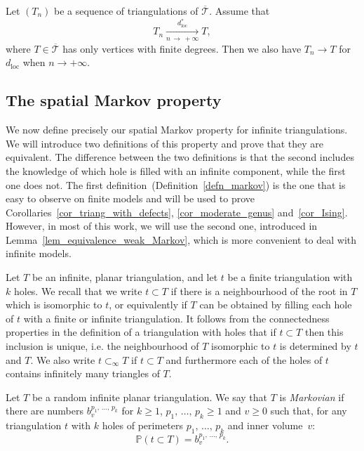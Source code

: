 \documentclass[AHL,Unicode,longabstracts,published]{cedram}
\newcommand{\loc}{\mathrm{loc}}
\newcommand{\T}{\mathcal{T}}
\renewcommand{\P}{\mathbb{P}}
\begin{document}
\begin{lemm}\label{lem_dual_convergence}
Let $(T_n)$ be a sequence of triangulations of $\overline{\T}$. Assume that
\[
T_n \xrightarrow[n\,\to\,+\infty]{d_{\loc}^*} T,
\]
where $T \in \overline{\T}$ has only vertices with finite degrees. Then we also have $T_n \to T$ for $d_{\loc}$ when $n \to +\infty$.
\end{lemm}


\subsection{The spatial Markov property}

We now define precisely our spatial Markov property for infinite triangulations. We will introduce two definitions of this property and prove that they are equivalent. The difference between the two definitions is that the second includes the knowledge of which hole is filled with an infinite component, while the first one does not. The first definition~(Definition~\ref{defn_markov}) is the one that is easy to observe on finite models and will be used to prove Corollaries~\ref{cor_triang_with_defects}, \ref{cor_moderate_genus} and~\ref{cor_Ising}. However, in most of this work, we will use the second one, introduced in Lemma~\ref{lem_equivalence_weak_Markov}, which is more convenient to deal with infinite models.

Let $T$ be an infinite, planar triangulation, and let $t$ be a finite triangulation with $k$ holes. We recall that we write $t \subset T$ if there is a neighbourhood of the root in $T$ which is isomorphic to $t$, or equivalently if $T$ can be obtained by filling each hole of $t$ with a finite or infinite triangulation. It follows from the connectedness properties in the definition of a triangulation with holes that if $t \subset T$ then this inclusion is unique, i.e. the neighbourhood of $T$ isomorphic to $t$ is determined by $t$ and $T$. We also write $t \subset_{\infty} T$ if $t \subset T$ and furthermore each of the holes of $t$ contains infinitely many triangles of $T$.

\begin{defi}\label{defn_markov}
Let $T$ be a random infinite planar triangulation. We say that $T$ is \emph{Markovian} if there are numbers $b^{p_1,\,\dots,\, p_k}_v$ for $k \geq 1$, $p_1,\,\dots,\,p_k \geq 1$ and $v \geq 0$ such that, for any triangulation $t$ with $k$ holes of perimeters $p_1,\,\dots,\,p_k$ and inner volume~$v$:
\[
\P \left(t \subset T \right) = b^{p_1,\,\dots,\,p_k}_v.
\]
\end{defi}
\end{document}
